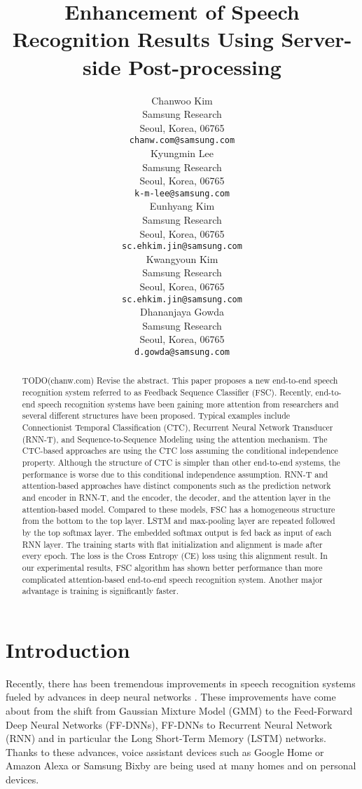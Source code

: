 \documentclass{article}
\title{Enhancement of Speech Recognition Results Using Server-side
Post-processing}
\author{
  Chanwoo Kim  \\
  Samsung Research \\
  Seoul, Korea, 06765 \\
  \texttt{chanw.com@samsung.com}  \\
  \And
  Kyungmin Lee  \\
  Samsung Research \\
  Seoul, Korea, 06765 \\
  \texttt{k-m-lee@samsung.com} \\
  \And
  Eunhyang Kim  \\
  Samsung Research \\
  Seoul, Korea, 06765 \\
  \texttt{sc.ehkim.jin@samsung.com} \\
  \And
  Kwangyoun Kim \\
  Samsung Research \\
  Seoul, Korea, 06765 \\
  \texttt{sc.ehkim.jin@samsung.com} \\
  \And
  Dhananjaya Gowda \\
  Samsung Research \\
  Seoul, Korea, 06765 \\
  \texttt{d.gowda@samsung.com} \\
}
\begin{document}

\maketitle

\begin{abstract}
TODO(chanw.com) Revise the abstract.
This paper proposes a new end-to-end speech recognition system referred to
as Feedback Sequence Classifier (FSC). Recently, end-to-end speech
recognition systems have been gaining more attention from researchers and
several different structures have been proposed. Typical examples  
include Connectionist Temporal Classification (CTC), Recurrent Neural Network
  Transducer (RNN-T), and Sequence-to-Sequence Modeling using the attention
mechanism. The CTC-based approaches are using the CTC loss assuming the
conditional independence property. Although the structure of CTC is simpler
than other end-to-end systems, the performance is worse due to this conditional
independence assumption. RNN-T and attention-based approaches have distinct
components such as the prediction network  and encoder in RNN-T, and
the encoder, the decoder, and the attention layer in the attention-based model.
Compared to these models, FSC has a homogeneous structure from the bottom to 
the top layer. LSTM and max-pooling layer are repeated followed by the top
softmax layer. The embedded softmax output is fed back as input of each RNN
layer. The training starts with flat initialization and alignment is made
after every epoch. The loss is the Cross Entropy (CE) loss using this 
alignment result. In our experimental results, FSC algorithm has shown 
better performance than more complicated attention-based end-to-end speech
recognition system. Another major advantage is training is significantly
faster.
\end{abstract}

\section{Introduction}

Recently, there has been tremendous improvements in speech recognition
systems fueled by advances in deep neural networks
\cite{
  Yu2013FeatureLearningDNN, 
  g_hinton_ieee_signal_processing_mag_2012,
  Seltzer2013DNNAurora4, 
  t_sainath_taslp_2017_00,
  t_sainath_book_chapter_2017_00,
  v_vanhoucke_nips_workshop_2011_00}.
These improvements have come about from the shift from Gaussian Mixture Model
(GMM) to the Feed-Forward Deep Neural Networks (FF-DNNs), FF-DNNs
to Recurrent Neural Network (RNN) and in particular the Long Short-Term Memory
(LSTM) networks.
Thanks to these advances, voice assistant devices such as Google Home
\cite{C_Kim_INTERSPEECH_2017_1, B_Li_INTERSPEECH_2017_1}
or Amazon Alexa or Samsung Bixby are being used at many homes and on personal devices.
\end{document}
